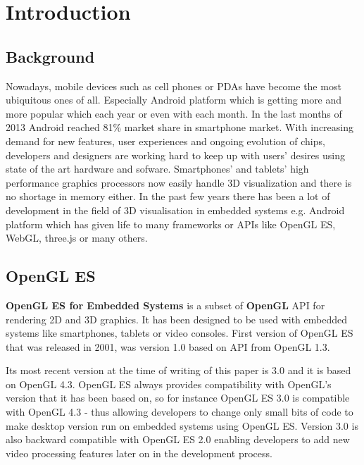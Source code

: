 \documentclass[a4paper,12pt]{article}
\begin{document}


\section{Introduction}

\subsection{Background}
Nowadays, mobile devices such as cell phones or PDAs have become the most ubiquitous ones of all.
Especially Android platform which is getting more and more popular which each year or even with each month.
In the last months of 2013 Android reached 81\% market share in smartphone market. 
With increasing demand for new features, user experiences and ongoing evolution of chips,  developers and designers are working hard to keep up with users' desires using state of the art hardware and sofware.
Smartphones’ and tablets’ high performance graphics processors now easily handle 3D visualization and there is no shortage in memory either. 
In the past few years there has been a lot of development in the field of 3D visualisation in embedded systems e.g. Android platform which has given life to many frameworks or APIs like OpenGL ES, WebGL, three.js or many others.

\subsection{OpenGL ES}
\textbf{OpenGL ES for Embedded Systems} \cite{opengles_kronos} is a subset of \textbf{OpenGL} \cite{opengl_kronos} API for rendering 2D and 3D graphics.
It has been designed to be used with embedded systems like smartphones, tablets or video consoles.
First version of OpenGL ES that was released in 2001, was version 1.0 based on API from OpenGL 1.3.

Its most recent version at the time of writing of this paper is 3.0 and it is based on OpenGL 4.3. 
OpenGL ES always provides compatibility with OpenGL's version that it has been based on, so for instance OpenGL ES 3.0 is compatible with OpenGL 4.3 - thus allowing developers to change only small bits of code to make desktop version run on embedded systems using OpenGL ES.
Version 3.0 is also backward compatible with OpenGL ES 2.0 enabling developers to add new video processing features later on in the development process.
\end{document}
